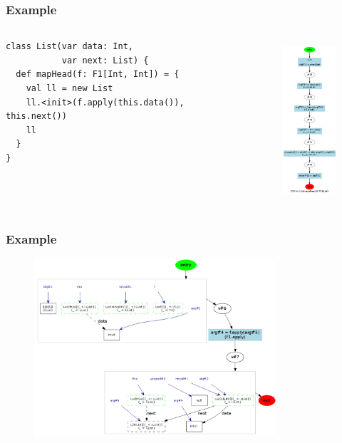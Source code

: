 \documentclass[hyperref={pdfpagelabels=false}]{beamer}
\begin{document}
\begin{frame}[fragile]
\frametitle{Example}
  \begin{columns}
    \begin{column}{0.4\textwidth}
\begin{lstlisting}[escapechar=\%]
class List(var data: Int,
           var next: List) {
  def mapHead(f: F1[Int, Int]) = {
    val ll = new List
    ll.<init>(f.apply(this.data()), this.next())
    ll
  }
}
\end{lstlisting}
    \end{column}
    \begin{column}{0.6\textwidth}
      \begin{figure}[t]
        \includegraphics[height=60mm]{images/e3.png}\\
      \end{figure}
    \end{column}
  \end{columns}
\end{frame}

\begin{frame}[fragile]
\frametitle{Example}
  \begin{figure}[t]
    \begin{center}
    \includegraphics[width=90mm]{images/e4.png}\\
    \end{center}
  \end{figure}
\end{frame}
\end{document}
